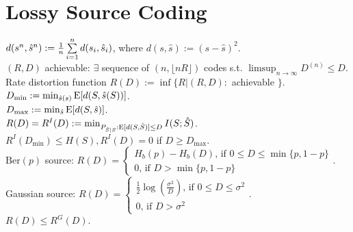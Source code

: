 \section{Lossy Source Coding}

$d(s^n, \hat s^n):=\frac1n\sum\limits_{i=1}^nd(s_i, \hat s_i)$, where $d(s, \hat s):=(s-\hat s)^2$.\\
$(R, D)$ achievable: $\exists$ sequence of $(n, \lfloor nR\rfloor)$ codes s.t. $\limsup_{n\to\infty}D^{(n)}\leq D$.\\
Rate distortion function $R(D):=\inf\{R|(R, D):$ achievable $\}$.\\
$D_{\min}:=\min_{\hat s(s)}\mathrm{E}[d(S, \hat s(S))]$.\\
$D_{\max}:=\min_{\hat s}\mathrm{E}[d(S, \hat s)]$.\\
$R(D)=R^I(D):=\min_{P_{\hat S|S}:\mathrm{E}[d(S, \hat S)]\leq D}I(S; \hat S)$.\\
$R^I(D_{\min})\leq H(S), R^I(D)=0$ if $D\geq D_{\max}$.\\
$\mathrm{Ber}(p)$ source: $R(D)=\begin{cases}
H_b(p)-H_b(D)\text{, if }0\leq D\leq\min\{p, 1-p\}\\
0\text{, if }D>\min\{p, 1-p\}
\end{cases}$.\\
Gaussian source: $R(D)=\begin{cases}
\frac12\log(\frac{\sigma^2}D)\text{, if }0\leq D\leq\sigma^2\\
0\text{, if }D>\sigma^2
\end{cases}$.\\
$R(D)\leq R^G(D)$.

